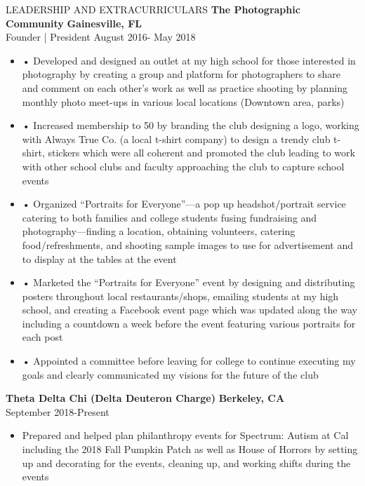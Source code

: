 \documentclass{resume}
\begin{document}

\begin{rSection}{LEADERSHIP AND EXTRACURRICULARS}
\small
{\bf The Photographic Community } \hfill {\bf Gainesville, FL}
\\ {Founder | President 		}  \hfill {August 2016- May 2018}
\begin{itemize}
  \item •	Developed and designed an outlet at my high school for those interested in photography by creating a group and platform for photographers to share and comment on each other’s work as well as practice shooting by planning monthly photo meet-ups in various local locations (Downtown area, parks)
  \item •	Increased membership to 50 by branding the club designing a logo, working with Always True Co. (a local t-shirt company) to design a trendy club t-shirt, stickers which were all coherent and promoted the club leading to work with other school clubs and faculty approaching the club to capture school events
  \item •	Organized “Portraits for Everyone”—a pop up headshot/portrait service catering to both families and college students fusing fundraising and photography—finding a location, obtaining volunteers, catering food/refreshments, and shooting sample images to use for advertisement and to display at the tables at the event 
  \item •	Marketed the “Portraits for Everyone” event by designing and distributing posters throughout local restaurants/shops, emailing students at my high school, and creating a Facebook event page which was updated along the way including a countdown a week before the event featuring various portraits for each post
  \item •	Appointed a committee before leaving for college to continue executing my goals and clearly communicated my visions for the future of the club
\end{itemize}

{\bf Theta Delta Chi (Delta Deuteron Charge) } \hfill {\bf Berkeley, CA}
\\ {} \hfill {September 2018-Present}
\begin{itemize}
  \item Prepared and helped plan philanthropy events for Spectrum: Autism at Cal including the 2018 Fall Pumpkin Patch as well as House of Horrors by setting up and decorating for the events, cleaning up, and working shifts during the events
\end{itemize}


\end{rSection}
\end{document}
